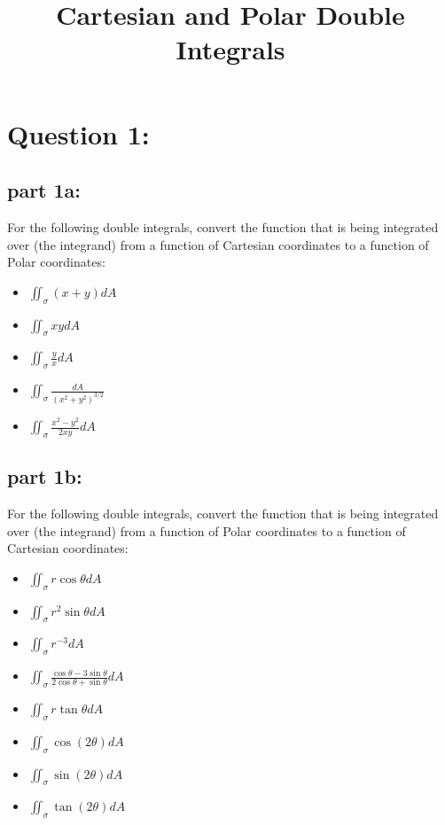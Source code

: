 \documentclass{article}
\title{Cartesian and Polar Double Integrals}
\date{}
\begin{document}
\maketitle




\section*{Question 1:}

\subsection*{part 1a:}

For the following double integrals, convert the function that is being integrated over (the integrand) from a function of Cartesian coordinates to a function of Polar coordinates:

\begin{itemize}
\item \(\iint_{\sigma} (x + y)dA\)
\item \(\iint_{\sigma} xy dA\)
\item \(\iint_{\sigma} \frac{y}{x}dA\)
\item \(\iint_{\sigma} \frac{dA}{(x^2 + y^2)^{3/2}}\)
\item \(\iint_{\sigma} \frac{x^2 - y^2}{2xy} dA\)
\end{itemize}


\subsection*{part 1b:}

For the following double integrals, convert the function that is being integrated over (the integrand) from a function of Polar coordinates to a function of Cartesian coordinates:

\begin{itemize}
\item \(\iint_{\sigma} r\cos\theta dA\)
\item \(\iint_{\sigma} r^2\sin\theta dA\)
\item \(\iint_{\sigma} r^{-3}dA\)
\item \(\iint_{\sigma} \frac{\cos\theta - 3\sin\theta}{2\cos\theta + \sin\theta}dA\)
\item \(\iint_{\sigma} r\tan\theta dA\)
\item \(\iint_{\sigma} \cos(2\theta) dA\)
\item \(\iint_{\sigma} \sin(2\theta) dA\)
\item \(\iint_{\sigma} \tan(2\theta) dA\)
\end{itemize}
\end{document}
